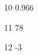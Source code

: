 \begin{loigiaibt}{10}
 0.966
\end{loigiaibt}
\begin{loigiaibt}{11}
 78
\end{loigiaibt}
\begin{loigiaibt}{12}
 -3
\end{loigiaibt}
